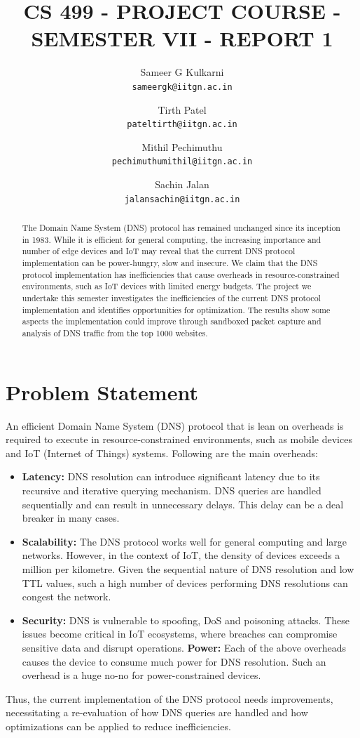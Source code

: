 \documentclass{article}
\title{\textbf{CS 499 - PROJECT COURSE - SEMESTER VII - REPORT 1}}
\author{
  Sameer G Kulkarni\\
  \texttt{sameergk@iitgn.ac.in}
  \and
  Tirth Patel\\
  \texttt{pateltirth@iitgn.ac.in}
  \and
  Mithil Pechimuthu\\
  \texttt{pechimuthumithil@iitgn.ac.in}
  \and
  Sachin Jalan\\
  \texttt{jalansachin@iitgn.ac.in}
}
\begin{document}
\maketitle

\begin{abstract}
The Domain Name System (DNS) protocol has remained unchanged since its inception in 1983. While it is efficient for general computing, the increasing importance and number of edge devices and IoT may reveal that the current DNS protocol implementation can be power-hungry, slow and insecure. We claim that the DNS protocol implementation has inefficiencies that cause overheads in resource-constrained environments, such as IoT devices with limited energy budgets. The project we undertake this semester investigates the inefficiencies of the current DNS protocol implementation and identifies opportunities for optimization. The results show some aspects the implementation could improve through sandboxed packet capture and analysis of DNS traffic from the top 1000 websites.
\end{abstract}

\section{Problem Statement}
An efficient Domain Name System (DNS) protocol that is lean on overheads is required to execute in resource-constrained environments, such as mobile devices and IoT (Internet of Things) systems. Following are the main overheads:
\begin{itemize}
    \item \textbf{Latency:} DNS resolution can introduce significant latency due to its recursive and iterative querying mechanism. DNS queries are handled sequentially and can result in unnecessary delays. This delay can be a deal breaker in many cases.
    \item \textbf{Scalability:} The DNS protocol works well for general computing and large networks. However, in the context of IoT, the density of devices exceeds a million per kilometre. Given the sequential nature of DNS resolution and low TTL values, such a high number of devices performing DNS resolutions can congest the network.
    \item \textbf{Security:} DNS is vulnerable to spoofing, DoS and poisoning attacks. These issues become critical in IoT ecosystems, where breaches can compromise sensitive data and disrupt operations.
    \textbf{Power:} Each of the above overheads causes the device to consume much power for DNS resolution. Such an overhead is a huge no-no for power-constrained devices.
\end{itemize}
Thus, the current implementation of the DNS protocol needs improvements, necessitating a re-evaluation of how DNS queries are handled and how optimizations can be applied to reduce inefficiencies.
\end{document}
